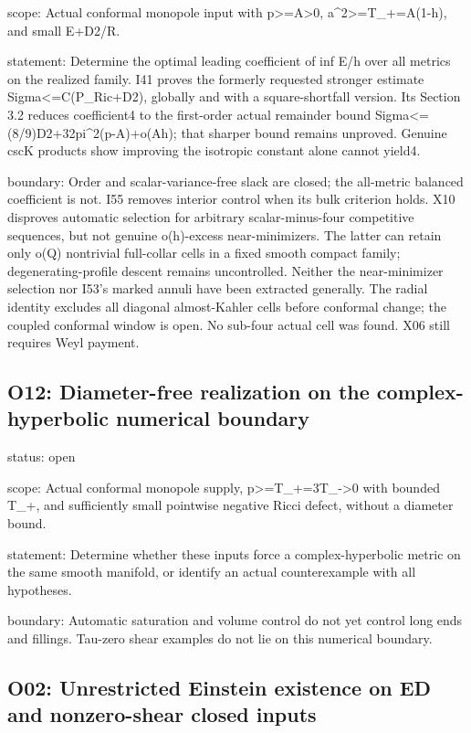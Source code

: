 \documentclass[
  10pt,
]{article}
\begin{document}
scope: Actual conformal monopole input with
p\textgreater=A\textgreater0, a\^{}2\textgreater=T\_+=A(1-h), and small
E+D2/R.

statement: Determine the optimal leading coefficient of inf E/h over all
metrics on the realized family. I41 proves the formerly requested
stronger estimate Sigma\textless=C(P\_Ric+D2), globally and with a
square-shortfall version. Its Section 3.2 reduces coefficient4 to the
first-order actual remainder bound
Sigma\textless=(8/9)D2+32pi\^{}2(p-A)+o(Ah); that sharper bound remains
unproved. Genuine cscK products show improving the isotropic constant
alone cannot yield4.

boundary: Order and scalar-variance-free slack are closed; the
all-metric balanced coefficient is not. I55 removes interior control
when its bulk criterion holds. X10 disproves automatic selection for
arbitrary scalar-minus-four competitive sequences, but not genuine
o(h)-excess near-minimizers. The latter can retain only o(Q) nontrivial
full-collar cells in a fixed smooth compact family; degenerating-profile
descent remains uncontrolled. Neither the near-minimizer selection nor
I53's marked annuli have been extracted generally. The radial identity
excludes all diagonal almost-Kahler cells before conformal change; the
coupled conformal window is open. No sub-four actual cell was found. X06
still requires Weyl payment.

\hypertarget{o12-diameter-free-realization-on-the-complex-hyperbolic-numerical-boundary}{%
\subsection{O12: Diameter-free realization on the complex-hyperbolic
numerical
boundary}\label{o12-diameter-free-realization-on-the-complex-hyperbolic-numerical-boundary}}

status: open

scope: Actual conformal monopole supply,
p\textgreater=T\_+=3T\_-\textgreater0 with bounded T\_+, and
sufficiently small pointwise negative Ricci defect, without a diameter
bound.

statement: Determine whether these inputs force a complex-hyperbolic
metric on the same smooth manifold, or identify an actual counterexample
with all hypotheses.

boundary: Automatic saturation and volume control do not yet control
long ends and fillings. Tau-zero shear examples do not lie on this
numerical boundary.

\hypertarget{o02-unrestricted-einstein-existence-on-ed-and-nonzero-shear-closed-inputs}{%
\subsection{O02: Unrestricted Einstein existence on ED and nonzero-shear
closed
inputs}\label{o02-unrestricted-einstein-existence-on-ed-and-nonzero-shear-closed-inputs}}
\end{document}

